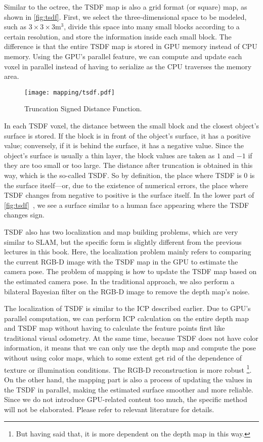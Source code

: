 Similar to the octree, the TSDF map is also a grid format (or square) map, as shown in \autoref{fig:tsdf}. First, we select the three-dimensional space to be modeled, such as $3\times3\times3 \text{m}^3$, divide this space into many small blocks according to a certain resolution, and store the information inside each small block. The difference is that the entire TSDF map is stored in GPU memory instead of CPU memory. Using the GPU's parallel feature, we can compute and update each voxel in parallel instead of having to serialize as the CPU traverses the memory area.

\begin{figure}[!t]
	\centering
	\texttt{[image: mapping/tsdf.pdf]}
	\caption{Truncation Signed Distance Function.}
	\label{fig:tsdf}
\end{figure}

In each TSDF voxel, the distance between the small block and the closest object's surface is stored. If the block is in front of the object's surface, it has a positive value; conversely, if it is behind the surface, it has a negative value. Since the object's surface is usually a thin layer, the block values are taken as $1$ and $-1$ if they are too small or too large. The distance after truncation is obtained in this way, which is the so-called TSDF. So by definition, the place where TSDF is 0 is the surface itself—or, due to the existence of numerical errors, the place where TSDF changes from negative to positive is the surface itself. In the lower part of \autoref{fig:tsdf}~, we see a surface similar to a human face appearing where the TSDF changes sign.

TSDF also has two localization and map building problems, which are very similar to SLAM, but the specific form is slightly different from the previous lectures in this book. Here, the localization problem mainly refers to comparing the current RGB-D image with the TSDF map in the GPU to estimate the camera pose. The problem of mapping is how to update the TSDF map based on the estimated camera pose. In the traditional approach, we also perform a bilateral Bayesian filter on the RGB-D image to remove the depth map's noise.

The localization of TSDF is similar to the ICP described earlier. Due to GPU's parallel computation, we can perform ICP calculation on the entire depth map and TSDF map without having to calculate the feature points first like traditional visual odometry. At the same time, because TSDF does not have color information, it means that we can only use the depth map and compute the pose without using color maps, which to some extent get rid of the dependence of texture or illumination conditions. The RGB-D reconstruction is more robust \footnote{But having said that, it is more dependent on the depth map in this way. }. On the other hand, the mapping part is also a process of updating the values ​​in the TSDF in parallel, making the estimated surface smoother and more reliable. Since we do not introduce GPU-related content too much, the specific method will not be elaborated. Please refer to relevant literature for details.

